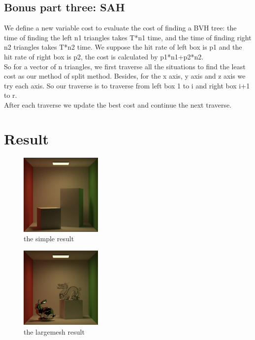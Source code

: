 \documentclass[acmtog]{acmart}
\begin{document}
\subsection{Bonus part three: SAH}

We define a new variable cost to evaluate the cost of finding a BVH tree: the time of finding the left n1 triangles takes T*n1 time, and the time of finding right n2 triangles takes T*n2 time. We suppose the hit rate of left box is p1 and the hit rate of right box is p2, the cost is calculated by p1*n1+p2*n2. \\
So for a vector of n triangles, we first traverse all the situations to find the least cost as our method of split method. Besides, for the x axis, y axis and z axis we try each axis. So our traverse is to traverse from left box 1 to i and right box i+1 to r.\\
After each traverse we update the best cost and continue the next traverse.

\newpage
\section{Result}

\begin{figure}[h]
\includegraphics[width=4cm,height=4cm]{simple}
\caption{the simple result}
\end{figure}

\begin{figure}[h]
\includegraphics[width=4cm,height=4cm]{large_mesh}
\caption{the largemesh result}
\end{figure}
\end{document}
